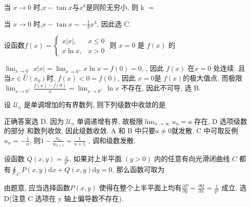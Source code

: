 \documentclass[kindlepaper]{BHCexam4kindle}
\begin{document}
\printanswers %
	\fubiaoti{}
	\maketitle
	\begin{questions}
		\qs 当 $x \rightarrow 0$ 时,$x-\tan x$与$x^{k}$是同阶无穷小, 则 k $=$ \xx
		\begin{solution}
			当 $x \rightarrow 0$ 时,$x-\tan x \sim-\frac{1}{3} x^{3}$, 因此选 C.
		\end{solution}

		\qs 设函数$f(x)=\left\{\begin{array}{ll}{x|x|,} & {x \leqslant 0} \\ {x \ln x,} & {x>0}\end{array}\right.$
			则 $x=0$ 是 $f(x)$ 的 \xx
			\begin{solution}
				$\lim _{x \rightarrow 0^{-}} x|x|=\lim _{x \rightarrow 0^{+}} x \ln x=f(0)=0$,
				, 因此 $f(x)$ 在$x=0$ 处连续. 且当$x \in \stackrel{\circ}{U}\left(x_{0}\right)$时,
				$f(x)<0=f(0)$, 因此 $x=0$是 $f(x)$的极大值点. 而极限$\lim _{x \rightarrow 0^{+}} \frac{f(x)-f(0)}{x}=\lim _{x \rightarrow 0^{+}} \ln x$
				不存在, 因此不可导, 选 B.
			\end{solution}

		\qs 设 $\mathcal{U}_{n}$ 是单调增加的有界数列, 则下列级数中收敛的是 \xx
		\begin{solution}
			正确答案选 D. 因为 $\mathcal{U}_{n}$  单调递增有界, 故极限$\lim _{n \rightarrow \infty} u_{n}=a$ 存在, D 选项级数的部分
			和数列收敛, 因此级数收敛. A 和 B 中只要$a \neq 0$就发散. C 中可取反例$u_{n}=-\frac{1}{n}$, 则$1-\frac{u_{n}}{u_{n+1}}=\frac{1}{n+1}$
			, 调和级数发散.
		\end{solution}

		\qs 设函数 $Q(x, y)=\frac{x}{y^{2}}$, 如果对上半平面 $(y>0)$ 内的任意有向光滑闭曲线 $C$ 都有$\oint_{C} P(x, y) \mathrm{d} x+Q(x, y) \mathrm{d} y=0$, 那么函数可取为\xx
		\begin{solution}
			由题意, 应当选择函数$P(x, y)$ 使得在整个上半平面上均有$\frac{\partial P}{\partial y}=\frac{\partial Q}{\partial x}=\frac{1}{y^{2}}$
			成立, 选D(注意 C 选项在 y 轴上偏导数不存在).
		\end{solution}


\end{questions}
\end{document}
